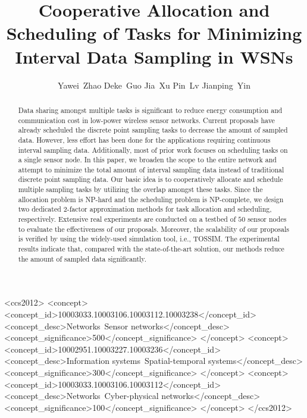 \documentclass[prodmode,acmtosn]{acmsmall}
\begin{document}
\title{Cooperative Allocation and Scheduling of Tasks for Minimizing  Interval Data Sampling in WSNs}

\author{Yawei~Zhao
Deke~Guo
Jia~Xu
Pin~Lv
Jianping~Yin
}

\begin{abstract}
Data sharing amongst multiple tasks is significant to reduce energy consumption and communication cost in low-power wireless sensor networks. Current proposals have already scheduled the discrete point sampling tasks to decrease the amount of sampled data. However, less effort has been done for the applications requiring continuous interval sampling data. Additionally, most of prior work focuses on scheduling tasks on a single sensor node. In this paper, we broaden the scope to the entire network and attempt to minimize the total amount of interval sampling data instead of traditional discrete point sampling data. Our basic idea is to cooperatively allocate and schedule multiple sampling tasks by utilizing the overlap amongst these tasks. Since the allocation problem is NP-hard and the scheduling problem is NP-complete, we design two dedicated 2-factor approximation methods for task allocation and scheduling, respectively. Extensive real experiments are conducted on a testbed of $50$ sensor nodes to evaluate the effectiveness of our proposals. Moreover, the scalability of our proposals is verified by using the widely-used simulation tool, i.e., TOSSIM. The experimental results indicate that, compared with the state-of-the-art solution, our methods reduce the amount of sampled data significantly.
\end{abstract}

\begin{CCSXML}
<ccs2012>
<concept>
<concept_id>10003033.10003106.10003112.10003238</concept_id>
<concept_desc>Networks~Sensor networks</concept_desc>
<concept_significance>500</concept_significance>
</concept>
<concept>
<concept_id>10002951.10003227.10003236</concept_id>
<concept_desc>Information systems~Spatial-temporal systems</concept_desc>
<concept_significance>300</concept_significance>
</concept>
<concept>
<concept_id>10003033.10003106.10003112</concept_id>
<concept_desc>Networks~Cyber-physical networks</concept_desc>
<concept_significance>100</concept_significance>
</concept>
</ccs2012>
\end{CCSXML}
\end{document}
